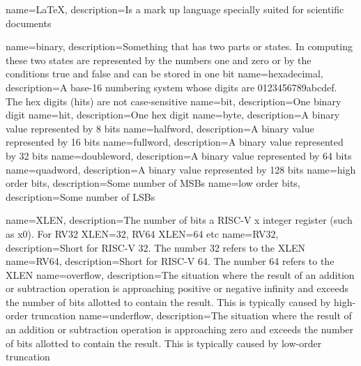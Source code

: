 {
    name=LaTeX,
    description={Is a mark up language specially suited
    for scientific documents}
}

{
	name=binary,
	description={Something that has two parts or states.  In computing
		these two states are represented by the numbers one and zero or
		by the conditions true and false and can be stored in one bit}
}
{
	name=hexadecimal,
	description={A base-16 numbering system whose digits are 
		0123456789abcdef.  The hex digits (hits) are not case-sensitive}
}
{
	name=bit,
	description={One binary digit}
}
{
	name={hit},
	description={One hex digit}
}
{
	name=byte,
	description={A binary value represented by 8 bits}
}
{
	name={halfword},
	description={A binary value represented by 16 bits}
}
{
	name={fullword},
	description={A binary value represented by 32 bits}
}
{
	name={doubleword},
	description={A binary value represented by 64 bits}
}
{
	name={quadword},
	description={A binary value represented by 128 bits}
}
{
	name={high order bits},
	description={Some number of MSBs}
}
{
    name={low order bits},
    description={Some number of LSBs}
}

{
	name=XLEN,
	description={The number of bits a RISC-V x integer register 
		(such as x0).  For RV32 XLEN=32, RV64 XLEN=64 etc}
}
{
	name=RV32,
	description={Short for RISC-V 32.  The number 32 refers to the XLEN}
}
{
	name=RV64,
	description={Short for RISC-V 64.  The number 64 refers to the XLEN}
}
{
	name=overflow,
	description={The situation where the result of an addition or 
		subtraction operation is approaching positive or negative 
		infinity and exceeds the number of bits allotted to contain 
		the result.  This is typically caused by high-order truncation}
}
{
	name=underflow,
	description={The situation where the result of an addition or 
		subtraction operation is approaching zero and exceeds the number 
		of bits allotted to contain the result.  This is typically
        caused by low-order truncation}
}

